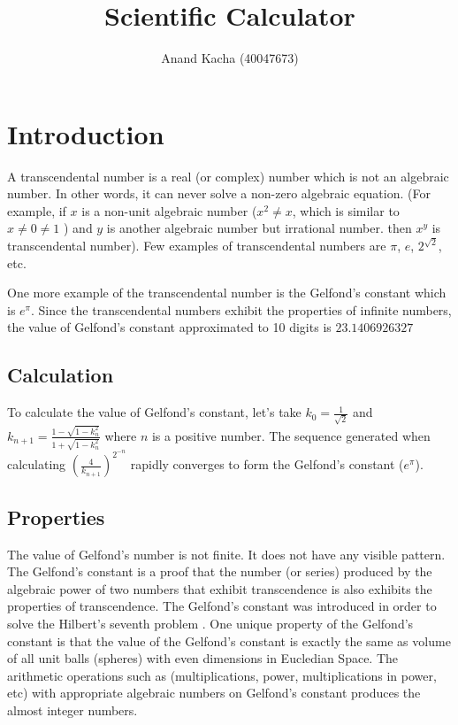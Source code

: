 \documentclass{article}
\title{Scientific Calculator}
\author{Anand Kacha (40047673)}
\begin{document}
\maketitle

\tableofcontents

\clearpage

\section{Introduction}
\justifying
A transcendental number \cite{transcendental} is a real (or complex) number which is not an algebraic number. In other words, it can never solve a non-zero algebraic equation. (For example, if $x$ is a non-unit algebraic number ($x^2 \ne x$, which is similar to $x \ne 0 \ne 1$ ) and $y$ is another algebraic number but irrational number. then $x^y$ is transcendental number). Few examples of transcendental numbers are $\pi$, $e$, $2^{\sqrt{2}}$, etc.
\begin{flushleft}
\justifying
One more example of the transcendental number is the Gelfond's constant \cite{gelfondsconstant} which is $e^{\pi}$. Since the transcendental numbers exhibit the properties of infinite numbers, the value of Gelfond's constant approximated to 10 digits is $23.1406926327$
\end{flushleft}

\subsection{Calculation}
\begin{flushleft}
\justifying
To calculate the value of Gelfond's constant, let's take $k_0 = \frac{1}{\sqrt{2}}$ and $k_{n+1} = \frac{1 - \sqrt{1 - k_n^2}}{1 + \sqrt{1 - k_n^2}}$ where $n$ is a positive number. The sequence generated when calculating $(\frac{4}{k_{n+1}})^{2^{-n}}$ rapidly converges to form the Gelfond's constant ($e^\pi$).
\end{flushleft}

\subsection{Properties}
\begin{flushleft}
\justifying
The value of Gelfond's number is not finite. It does not have any visible pattern. The Gelfond's constant is a proof that the number (or series) produced by the algebraic power of two numbers that exhibit transcendence is also exhibits the properties of transcendence. The Gelfond's constant was introduced in order to solve the Hilbert's seventh problem \cite{hilbertsproblems}. One unique property of the Gelfond's constant is that the value of the Gelfond's constant is exactly the same as volume of all unit balls (spheres) with even dimensions in Eucledian Space. The arithmetic operations such as (multiplications, power, multiplications in power, etc) with appropriate algebraic numbers on Gelfond's constant produces the almost integer numbers.
\end{flushleft}
\end{document}
